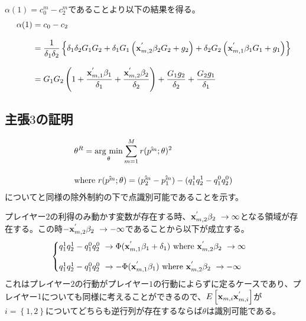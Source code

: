\documentclass{jsarticle}
\newcommand{\argmin}{\mathop{\rm arg~min}\limits}
\begin{document}
$\alpha(1) = c_0^m - c_2^m$であることより以下の結果を得る。
\begin{align*}
	\alpha(1) &= c_0 -c_2\\[8pt] &= \frac{1}{\delta_1 \delta_2}\left\{ \delta_1 \delta_2 G_1 G_2 + \delta_1 G_1 \left( {\bf x}_{m, 2}^{'} \beta_2 G_2 + g_2 \right) + \delta_2 G_2 \left( {\bf x}_{m, 1}^{'} \beta_1 G_1 + g_1 \right) \right\}\\[8pt]
	&= G_1 G_2 \left( 1 + \frac{{\bf x}_{m, 1}^{'} \beta_1}{\delta_1} + \frac{{\bf x}_{m, 2}^{'} \beta_2}{\delta_2} \right) + \frac{G_1g_2}{\delta_2} + \frac{G_2g_1}{\delta_1}
\end{align*}

\subsection{主張$3$の証明}
\begin{align*}
	&\theta^R = \argmin_{\theta} \sum_{m = 1}^M r(\hat{p^m} ; \theta)^2\\[10pt]
	&\text{where}\ r(\hat{p^m} ; \theta) = (\hat{p_2^m} - \hat{p_1^m}) - (q_1^1 q_2^1 - q_1^0 q_2^0)
\end{align*}
について\cite{Tamer2003a}と同様の除外制約の下で点識別可能であることを示す。

プレイヤー$2$の利得のみ動かす変数が存在する時、${\bf x}_{m, 2}^{'} \beta_2\ \to \infty$となる領域が存在する。この時$-{\bf x}_{m, 2}^{'} \beta_2\ \to -\infty$であることから以下が成立する。
\begin{align*}
\begin{cases}
	q_1^1 q_2^1 - q_1^0 q_2^0\ \to \Phi({\bf x}_{m, 1}^{'} \beta_1 + \delta_1)\ \text{where}\ {\bf x}_{m, 2}^{'} \beta_2\ \to \infty\\[10pt]
	q_1^1 q_2^1 - q_1^0 q_2^0\ \to -\Phi({\bf x}_{m, 1}^{'} \beta_1)\ \text{where}\ {\bf x}_{m, 2}^{'} \beta_2\ \to -\infty
\end{cases}
\end{align*}
これはプレイヤー$2$の行動がプレイヤー$1$の行動によらずに定るケースであり、プレイヤー$1$についても同様に考えることができるので、$E\left[ {\bf x}_{m, i} {\bf x}_{m, i}^{'} \right]$が$i = \left\{ 1,2 \right\}$についてどちらも逆行列が存在するならば$\theta$は識別可能である。



\end{document}
